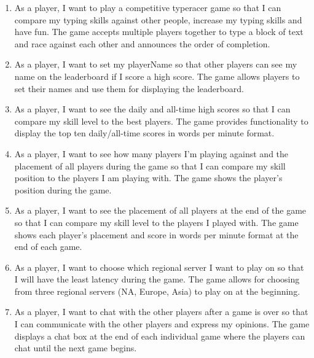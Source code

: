 \documentclass{article}
\begin{document}
\begin{enumerate}
	\item
	      As a player, I want to play a competitive typeracer game so that I can compare my typing skills against other people, increase my typing skills and have fun.
	      \AC
	      The game accepts multiple players together to type a block of text and race against each other and announces the order of completion.

	\item
	      As a player, I want to set my playerName so that other players can see my name on the leaderboard if I score a high score.
	      \AC
	      The game allows players to set their names and use them for displaying the leaderboard.

	\item
	      As a player, I want to see the daily and all-time high scores so that I can compare my skill level to the best players.
	      \AC
	      The game provides functionality to display the top ten daily/all-time scores in words per minute format.

	\item
	      As a player, I want to see how many players I’m playing against and the placement of all players during the game so that I can compare my skill position to the players I am playing with.
	      \AC
	      The game shows the player’s position during the game.

	\item
	      As a player, I want to see the placement of all players at the end of the game so that I can compare my skill level to the players I played with.
	      \AC
	      The game shows each player’s placement and score in words per minute format at the end of each game.

	\item
	      As a player, I want to choose which regional server I want to play on so that I will have the least latency during the game.
	      \AC
	      The game allows for choosing from three regional servers (NA, Europe, Asia) to play on at the beginning.

	\item
	      As a player, I want to chat with the other players after a game is over so that I can communicate with the other players and express my opinions.
	      \AC
	      The game displays a chat box at the end of each individual game where the players can chat until the next game begins.
\end{enumerate}
\end{document}

